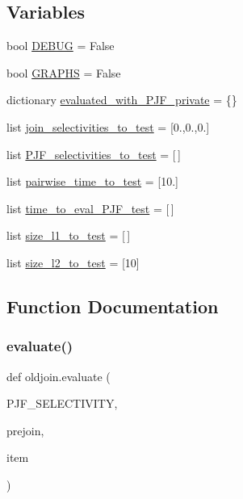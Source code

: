 \subsection*{Variables}
\begin{DoxyCompactItemize}
\item 
bool \mbox{\hyperlink{namespaceoldjoin_a117352cc494cc62c6b2f1882786a332c}{D\+E\+B\+UG}} = False
\item 
bool \mbox{\hyperlink{namespaceoldjoin_ab5b4f2bc5eb9b59855ac5b3251d83665}{G\+R\+A\+P\+HS}} = False
\item 
dictionary \mbox{\hyperlink{namespaceoldjoin_a92c0c194b6eaa00d63e4140804ffd6bf}{evaluated\+\_\+with\+\_\+\+P\+J\+F\+\_\+private}} = \{\}
\item 
list \mbox{\hyperlink{namespaceoldjoin_a5d84f12721d822ed265b6dee7a9e48a4}{join\+\_\+selectivities\+\_\+to\+\_\+test}} = \mbox{[}0.,0.,0.\mbox{]}
\item 
list \mbox{\hyperlink{namespaceoldjoin_a1eeb4af9ab535277cade5d3f16902166}{P\+J\+F\+\_\+selectivities\+\_\+to\+\_\+test}} = \mbox{[}$\,$\mbox{]}
\item 
list \mbox{\hyperlink{namespaceoldjoin_ad1a622991eb6c5dfe180fa4ec1aa1c49}{pairwise\+\_\+time\+\_\+to\+\_\+test}} = \mbox{[}10.\mbox{]}
\item 
list \mbox{\hyperlink{namespaceoldjoin_a5072c2af4042665dbe9d3ee2f3620596}{time\+\_\+to\+\_\+eval\+\_\+\+P\+J\+F\+\_\+test}} = \mbox{[}$\,$\mbox{]}
\item 
list \mbox{\hyperlink{namespaceoldjoin_a633a4b5ea8e51c8a8122d22a96a6e5c9}{size\+\_\+l1\+\_\+to\+\_\+test}} = \mbox{[}$\,$\mbox{]}
\item 
list \mbox{\hyperlink{namespaceoldjoin_a4e7b91dbb88e6f12875dcd0d1fbe731d}{size\+\_\+l2\+\_\+to\+\_\+test}} = \mbox{[}10\mbox{]}
\end{DoxyCompactItemize}


\subsection{Function Documentation}
\mbox{\label{namespaceoldjoin_a8b76cd232f566a0726e27b9e31cdd045}} 
\subsubsection{\texorpdfstring{evaluate()}{evaluate()}}
{\footnotesize\ttfamily def oldjoin.\+evaluate (\begin{DoxyParamCaption}\item[{}]{P\+J\+F\+\_\+\+S\+E\+L\+E\+C\+T\+I\+V\+I\+TY,  }\item[{}]{prejoin,  }\item[{}]{item }\end{DoxyParamCaption})}

